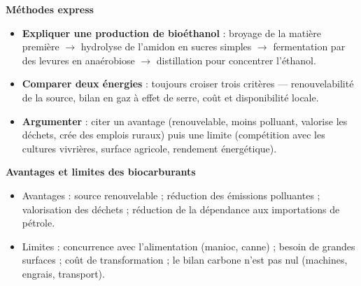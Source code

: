 \documentclass[11pt]{article}
\begin{document}
\begin{bilan}
\textbf{Méthodes express}
\begin{itemize}
  \item \textbf{Expliquer une production de bioéthanol} : broyage de la matière première $\rightarrow$ hydrolyse de l'amidon en sucres simples $\rightarrow$ fermentation par des levures en anaérobiose $\rightarrow$ distillation pour concentrer l'éthanol.
  \item \textbf{Comparer deux énergies} : toujours croiser trois critères — renouvelabilité de la source, bilan en gaz à effet de serre, coût et disponibilité locale.
  \item \textbf{Argumenter} : citer un avantage (renouvelable, moins polluant, valorise les déchets, crée des emplois ruraux) puis une limite (compétition avec les cultures vivrières, surface agricole, rendement énergétique).
\end{itemize}

\textbf{Avantages et limites des biocarburants}
\begin{itemize}
  \item Avantages : source renouvelable ; réduction des émissions polluantes ; valorisation des déchets ; réduction de la dépendance aux importations de pétrole.
  \item Limites : concurrence avec l'alimentation (manioc, canne) ; besoin de grandes surfaces ; coût de transformation ; le bilan carbone n'est pas nul (machines, engrais, transport).
\end{itemize}
\end{bilan}
\end{document}
